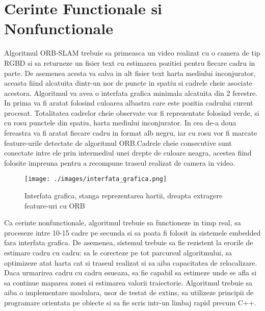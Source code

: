 \documentclass[12pt,a4paper]{report}
\begin{document}
\section{Cerinte Functionale si Nonfunctionale}
Algoritmul ORB-SLAM trebuie sa primeasca un video realizat cu o camera de tip RGBD si sa 
returneze un fisier text cu estimarea pozitiei pentru fiecare cadru in parte. De asemenea
acesta va salva in alt fisier text harta mediului inconjurator, aceasta fiind alcatuita 
dintr-un nor de puncte in spatiu si cadrele cheie asociate acestora. Algoritmul va avea 
o interfata grafica minimala alcatuita din 2 ferestre. In prima va fi aratat folosind 
culoarea albastra care este pozitia cadrului curent procesat. Totalitatea 
cadrelor cheie observate vor fi reprezentate folosind verde, si cu rosu punctele din 
spatiu, harta mediului inconjurator. In cea de-a doua fereastra va fi aratat fiecare 
cadru in format alb negru, iar cu rosu vor fi marcate feature-urile detectate de 
algoritmul ORB.\@ Cadrele cheie consecutive sunt conectate intre ele prin intermediul
unei drepte de culoare neagra, acestea fiind folosite impreuna pentru a recompune 
traseul realizat de camera in video. 
\begin{figure}[htbp] 
  \centering
  \texttt{[image: ./images/interfata\_grafica.png]}
  \caption{Interfata grafica, stanga reprezentarea hartii, dreapta extragere feature-uri cu ORB}
  \label{fig:exemplu_imagine}
\end{figure}            
Ca cerinte nonfunctionale, algoritmul trebuie sa functioneze in timp real, sa 
proceseze intre 10{-}15 cadre pe secunda si sa poata fi folosit in sistemele embedded 
fara interfata grafica. De asemenea, sistemul trebuie sa fie rezistent la erorile 
de estimare cadru cu cadru: sa le corecteze pe tot parcursul algoritmului, sa 
optimizeze atat harta cat si traseul realizat si sa aiba capacitatea de relocalizare.
Daca urmarirea cadru cu cadru esueaza, sa fie capabil sa estimeze unde se afla si 
sa continue maparea zonei si estimarea valorii traiectorie. Algoritmul trebuie sa 
aiba o implementare modulara, usor de testat de extins, sa utilizeze principii de 
programare orientata pe obiecte si sa fie scris intr-un limbaj rapid precum C++.
\end{document}
